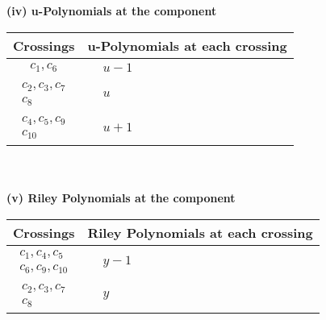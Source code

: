 \documentclass[1p]{elsarticle_modified}
\theoremstyle{definition}
\begin{document}
\newpage\renewcommand{\arraystretch}{1}
\flushleft \textbf{(iv) u-Polynomials at the component}\newline \\
\begin{tabular}{m{50pt}|m{274pt}}
Crossings & \hspace{64pt}u-Polynomials at each crossing \\
\hline $$\begin{aligned}c_{1},c_{6}\end{aligned}$$&$\begin{aligned}
&u-1
\end{aligned}$\\
\hline $$\begin{aligned}c_{2},c_{3},c_{7}\\c_{8}\end{aligned}$$&$\begin{aligned}
&u
\end{aligned}$\\
\hline $$\begin{aligned}c_{4},c_{5},c_{9}\\c_{10}\end{aligned}$$&$\begin{aligned}
&u+1
\end{aligned}$\\
\hline
\end{tabular}\\~\\
\newpage\renewcommand{\arraystretch}{1}
\flushleft \textbf{(v) Riley Polynomials at the component}\newline \\
\begin{tabular}{m{50pt}|m{274pt}}
Crossings & \hspace{64pt}Riley Polynomials at each crossing \\
\hline $$\begin{aligned}c_{1},c_{4},c_{5}\\c_{6},c_{9},c_{10}\end{aligned}$$&$\begin{aligned}
&y-1
\end{aligned}$\\
\hline $$\begin{aligned}c_{2},c_{3},c_{7}\\c_{8}\end{aligned}$$&$\begin{aligned}
&y
\end{aligned}$\\
\hline
\end{tabular}\\~\\
\end{document}
